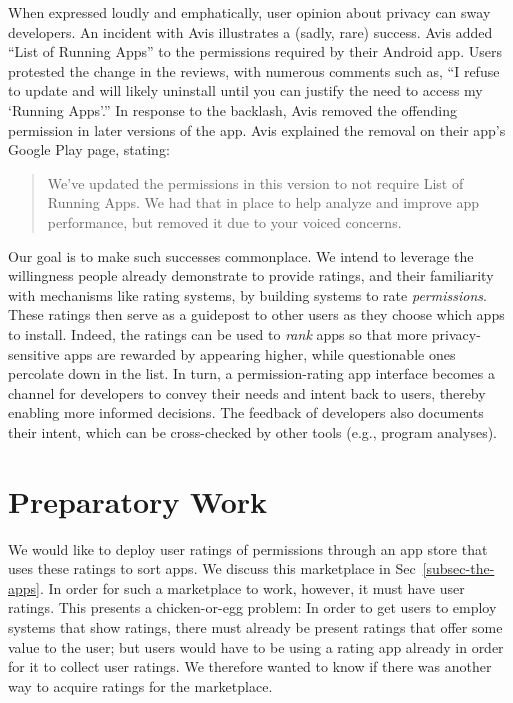 \documentclass[11pt]{article}
\begin{document}
When expressed loudly and emphatically, user opinion about privacy can
sway developers. An incident with Avis illustrates a (sadly,
rare) success. Avis added ``List of Running Apps'' to the permissions
required by their Android app. Users protested the change in the
reviews, with numerous comments such as, ``I refuse to update and will
likely uninstall until you can justify the need to access my `Running
Apps'.'' In response to the backlash, Avis removed the offending
permission in later versions of the app. Avis explained the removal on their app's Google Play
page, stating:
\begin{quote}
  We've updated the permissions in this version to not require List of
  Running Apps. We had that in place to help analyze and improve app
  performance, but removed it due to your voiced concerns.
\end{quote}

Our goal is to make such successes commonplace. We intend to leverage
the willingness people already demonstrate to provide ratings, and
their familiarity with mechanisms like rating systems, by building systems to rate
\emph{permissions}. These ratings then serve as a guidepost to other
users as they choose which apps to install. 
Indeed, the ratings can be used to \emph{rank} apps
so that more privacy-sensitive apps are rewarded by appearing higher,
while questionable ones percolate down in the list. In turn, a
permission-rating app interface becomes a channel for developers to
convey their needs and intent back to users, thereby enabling more
informed decisions. The feedback of developers also documents their
intent, which can be cross-checked by other tools (e.g., program
analyses).

\section{Preparatory Work}
\label{sec-prep-work}

We would like to deploy user ratings of permissions
through an app store that uses these ratings to sort
apps. We discuss this marketplace in Sec~\ref{subsec-the-apps}.
In order for such a marketplace to work, however, it must have user
ratings. This presents a chicken-or-egg problem: In order to get users
to employ systems that show ratings, there must already be present
ratings that offer some value to the user; but users would have to be
using a rating app already in order for it to collect user
ratings. We therefore wanted to know if there was another way to
acquire ratings for the marketplace.
\end{document}

